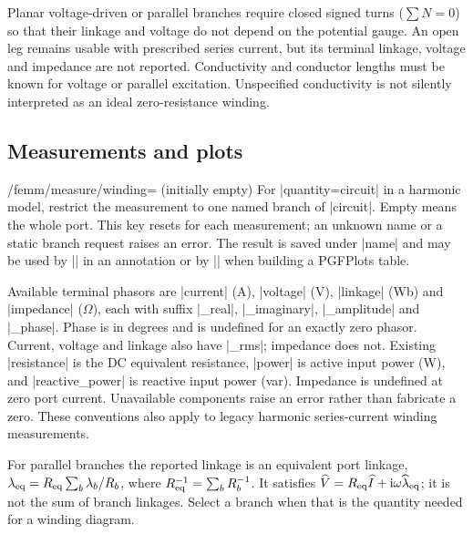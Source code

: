 Planar voltage-driven or parallel branches require closed signed turns
($\sum N=0$) so that their linkage and voltage do not depend on the potential
gauge. An open leg remains usable with prescribed series current, but its
terminal linkage, voltage and impedance are not reported. Conductivity and
conductor lengths must be known for voltage or parallel excitation. Unspecified
conductivity is not silently interpreted as an ideal zero-resistance winding.

\subsection{Measurements and plots}
\begin{key}{/femm/measure/winding= (initially empty)}
For |quantity=circuit| in a harmonic model, restrict the measurement to one
named branch of |circuit|. Empty means the whole port. This key resets for each
measurement; an unknown name or a static branch request raises an error. The
result is saved under |name| and may be used by |\femmvalue| in an annotation
or by |\femmresult| when building a PGFPlots table.
\end{key}
\begin{codeexample}
\femmmeasure[name=branch,quantity=circuit,circuit=supply,winding=lower]
\edef\CurrentPhase{\femmresult{branch}{current_phase}}
\end{codeexample}
Available terminal phasors are |current| (A), |voltage| (V), |linkage| (Wb)
and |impedance| ($\Omega$), each with suffix |_real|, |_imaginary|,
|_amplitude| and |_phase|. Phase is in degrees and is undefined for an exactly
zero phasor. Current, voltage and linkage also have |_rms|; impedance does not.
Existing |resistance| is the DC equivalent resistance, |power| is active input
power (W), and |reactive_power| is reactive input power (var). Impedance is
undefined at zero port current. Unavailable components raise an error rather
than fabricate a zero. These conventions also apply to legacy harmonic
series-current winding measurements.

For parallel branches the reported linkage is an equivalent port linkage,
$\lambda_{\rm eq}=R_{\rm eq}\sum_b\lambda_b/R_b$, where
$R_{\rm eq}^{-1}=\sum_bR_b^{-1}$. It satisfies
$\widehat V=R_{\rm eq}\widehat I+\mathrm i\omega\widehat\lambda_{\rm eq}$;
it is not the sum of branch linkages. Select a branch when that is the quantity
needed for a winding diagram.

